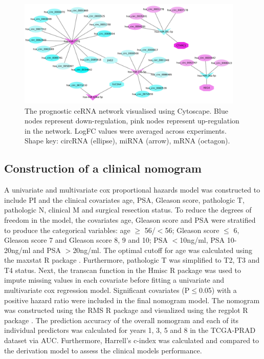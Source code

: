 \documentclass[twocolumn]{bmcart}%
\begin{document}
\begin{figure}[h!]
    \includegraphics[width=0.96\textwidth]{figures/prognostic_cytoscape.png}
    \caption{The prognostic ceRNA network visualised using Cytoscape. Blue nodes represent down-regulation, pink nodes represent up-regulation in the network. LogFC values were averaged across experiments. Shape key: circRNA (ellipse), miRNA (arrow), mRNA (octagon).}
    \label{fig:cytoscape}
\end{figure}

\subsection*{\textbf{Construction of a clinical nomogram}}
A univariate and multivariate cox proportional hazards model was constructed to include PI and the clinical covariates age, PSA, Gleason score, pathologic T, pathologic N, clinical M and surgical resection status. To reduce the degrees of freedom in the model, the covariates age, Gleason score and PSA were stratified to produce the categorical variables: age $\geq$ 56/$<$56; Gleason score $\leq$ 6, Gleason score 7 and Gleason score 8, 9 and 10; PSA $<$10ng/ml, PSA 10-20ng/ml and PSA $>$20ng/ml. The optimal cutoff for age was calculated using the maxstat R package \cite{maxstat}. Furthermore, pathologic T was simplified to T2, T3 and T4 status. Next, the transcan function in the Hmisc R package \cite{Hmisc} was used to impute missing values in each covariate before fitting a univariate and multivariate cox regression model. Significant covariates (P$\leq$0.05) with a positive hazard ratio were included in the final nomogram model. The nomogram was constructed using the RMS R package \cite{RMS} and visualized using the regplot R package \cite{regplot}. The prediction accuracy of the overall nomogram and each of its individual predictors was calculated for years 1, 3, 5 and 8 in the TCGA-PRAD dataset via AUC. Furthermore, Harrell's c-index was calculated and compared to the derivation model to assess the clinical models performance. 
\end{document}

